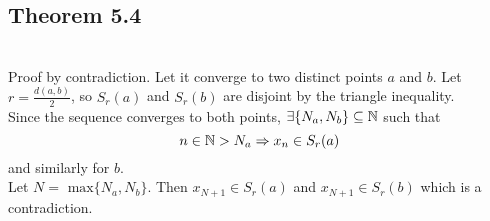 \subsection{Theorem 5.4}


\begin{solution}
 \\Proof by contradiction. Let it converge to two distinct points $a$ and $b$. Let $r = \frac{d(a,b)}{2}$, so $S_r(a)$ and $S_r(b)$ are disjoint by the triangle inequality.\\
 Since the sequence converges to both points, $\exists \{N_a,N_b\} \subseteq \mathbb{N}$ such that
 $$n \in \mathbb{N} > N_a \Rightarrow x_n \in S_r(a)$$
 and similarly for $b$. \\
 Let $N = \text{ max} \{N_a,N_b\}$. Then $x_{N+1} \in S_r(a)$ and $x_{N+1} \in S_r(b)$ which is a contradiction.
\end{solution}

